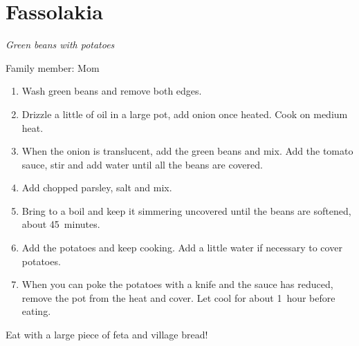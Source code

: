 \chapter{Fassolakia}
\label{ch:fassolakia}


\textit{Green beans with potatoes}

Family member: Mom


\begin{enumerate}
    \item Wash green beans and remove both edges.
    \item Drizzle a little of oil in a large pot, add onion once heated. Cook on medium heat.
    \item When the onion is translucent, add the green beans and mix. Add the tomato sauce, stir and add water until all the beans are covered.
    \item Add chopped parsley, salt and mix.
    \item Bring to a boil and keep it simmering uncovered until the beans are softened, about 45~minutes.
    \item Add the potatoes and keep cooking. Add a little water if necessary to cover potatoes.
    \item When you can poke the potatoes with a knife and the sauce has reduced, remove the pot from the heat and cover. Let cool for about 1~hour before eating.
\end{enumerate}

Eat with a large piece of feta and village bread!
